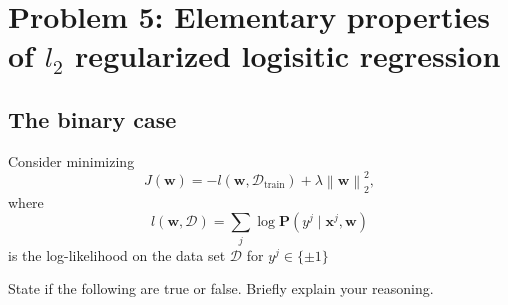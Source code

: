 \documentclass[letterpaper,11pt]{article}
\begin{document}
\section*{Problem 5: Elementary properties of $l_2$ regularized logisitic regression}

\subsection*{The binary case}

Consider minimizing
\begin{equation}
  J(\mathbf{w}) = -l\left(\mathbf{w},\mathcal{D}_\mathrm{train}\right) + \lambda\left\lVert\mathbf{w}\right\rVert_2^2,
\end{equation}
where
\begin{equation}
  l\left(\mathbf{w},\mathcal{D}\right) = \sum_j \log \mathbf{P}\left(
    y^j \mid \mathbf{x}^j, \mathbf{w}
  \right)
\end{equation}
is the log-likelihood on the data set $\mathcal{D}$ for
$y^j \in \{ \pm 1 \}$

State if the following are true or false. Briefly explain your reasoning.
\end{document}
